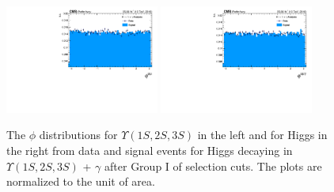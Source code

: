 \begin{figure}[!htbp]
\begin{center}
\includegraphics[width=0.45\textwidth]{figures/outputPlots/HtoUpsilon_Cat0_ZZZZZ/au/data_x_mc/noKinCuts/h_noKin_Upsilon_phi}\hspace*{1.cm}
\includegraphics[width=0.45\textwidth]{figures/outputPlots/HtoUpsilon_Cat0_ZZZZZ/au/data_x_mc/noKinCuts/h_noKin_Z_phi}
\end{center}\vspace*{-.5cm}
\caption{The $\phi$ distributions for $\Upsilon(1S,2S,3S)$ in the left and for Higgs in the right from data and signal events for Higgs decaying in $\Upsilon(1S,2S,3S)$ + $\gamma$ after Group I of selection cuts. The plots are normalized to the unit of area.}
\label{fig:phiUpsilon_and_Higgs_HtoUpsilon_Cat0}
\end{figure}


